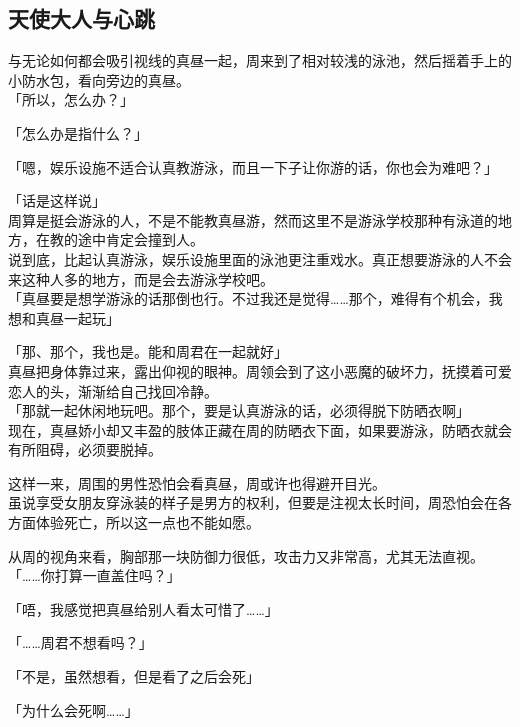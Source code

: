 \subsection{天使大人与心跳}

与无论如何都会吸引视线的真昼一起，周来到了相对较浅的泳池，然后摇着手上的小防水包，看向旁边的真昼。\\

「所以，怎么办？」

「怎么办是指什么？」

「嗯，娱乐设施不适合认真教游泳，而且一下子让你游的话，你也会为难吧？」

「话是这样说」\\

周算是挺会游泳的人，不是不能教真昼游，然而这里不是游泳学校那种有泳道的地方，在教的途中肯定会撞到人。\\

说到底，比起认真游泳，娱乐设施里面的泳池更注重戏水。真正想要游泳的人不会来这种人多的地方，而是会去游泳学校吧。\\

「真昼要是想学游泳的话那倒也行。不过我还是觉得……那个，难得有个机会，我想和真昼一起玩」

「那、那个，我也是。能和周君在一起就好」\\

真昼把身体靠过来，露出仰视的眼神。周领会到了这小恶魔的破坏力，抚摸着可爱恋人的头，渐渐给自己找回冷静。\\

「那就一起休闲地玩吧。那个，要是认真游泳的话，必须得脱下防晒衣啊」\\

现在，真昼娇小却又丰盈的肢体正藏在周的防晒衣下面，如果要游泳，防晒衣就会有所阻碍，必须要脱掉。

这样一来，周围的男性恐怕会看真昼，周或许也得避开目光。\\

虽说享受女朋友穿泳装的样子是男方的权利，但要是注视太长时间，周恐怕会在各方面体验死亡，所以这一点也不能如愿。

从周的视角来看，胸部那一块防御力很低，攻击力又非常高，尤其无法直视。\\

「……你打算一直盖住吗？」

「唔，我感觉把真昼给别人看太可惜了……」

「……周君不想看吗？」

「不是，虽然想看，但是看了之后会死」

「为什么会死啊……」\\

